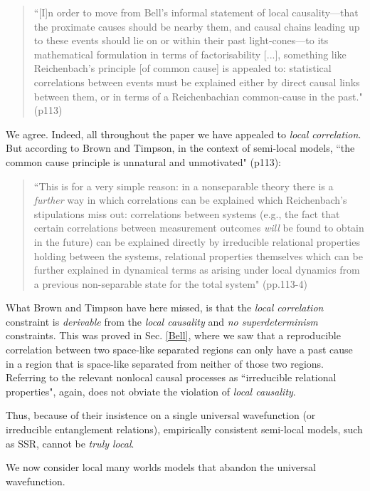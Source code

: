 \documentclass[a4paper]{article}
\begin{document}
\begin{quote}
``[I]n order to move from Bell's informal statement of local causality---that the proximate causes should be nearby them, and causal chains leading up to these events should lie on or within their past light-cones---to its mathematical formulation in terms of factorisability [...], something like Reichenbach's principle [of common cause] is appealed to: statistical correlations between events must be explained either by direct causal links  between them, or in terms of a Reichenbachian common-cause in the past."  (p113)
\end{quote}

We agree. Indeed, all throughout the paper we have appealed to \textit{local correlation}. But according to Brown and Timpson, in the context of semi-local models, ``the common cause principle is unnatural and unmotivated" (p113):

\begin{quote}
``This is for a very simple reason: in a nonseparable theory there is a \textit{further} way in which correlations can be explained which Reichenbach's stipulations miss out: correlations between systems (e.g., the fact that certain correlations between measurement outcomes \textit{will} be found to obtain in the future) can be explained directly by irreducible relational properties holding between the systems, relational properties themselves which can be further explained in dynamical terms as arising under local dynamics from a previous non-separable state for the total system" (pp.113-4)
\end{quote}

What Brown and Timpson have here missed, is that the \textit{local correlation} constraint is \textit{derivable} from the \textit{local causality} and \textit{no superdeterminism} constraints. This was proved in Sec. \ref{Bell}, where we saw that a reproducible correlation between two space-like separated regions can only have a past cause in a region that is space-like separated from neither of those two regions. Referring to the relevant nonlocal causal processes as ``irreducible relational properties", again, does not obviate the violation of  \textit{local causality}.

Thus, because of their insistence on a single universal wavefunction (or irreducible entanglement relations), empirically consistent semi-local models, such as SSR, cannot be \textit{truly local}.  
 
We now consider local many worlds models that abandon the universal wavefunction.
\end{document}
